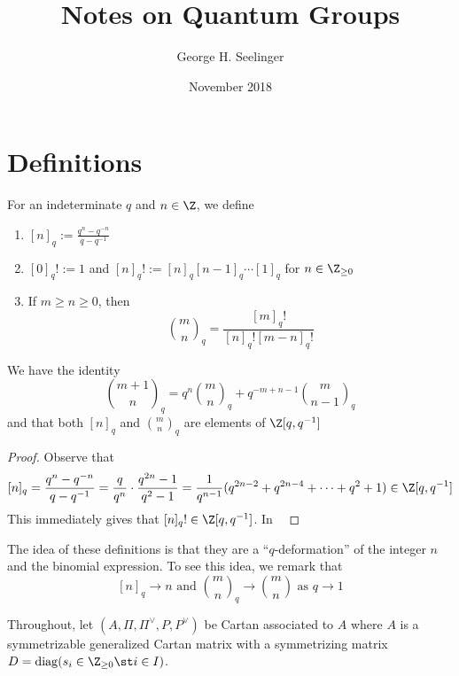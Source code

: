 \documentclass[11pt,leqno,oneside]{amsart}
\title[Notes on Quantum Groups]{Notes on Quantum Groups}
\author{George H. Seelinger}
\date{November 2018}
\numberwithin{thm}{section}
\newcommand{\weightlattice}{P}
\renewcommand{\simpleroots}{\Pi}
\newcommand{\qfactorial}[1]{[#1]_q!}
\newcommand{\qbinom}[3][q]{\binom{#2}{#3}_{#1}}
\DeclareMathOperator{\diag}{diag}
\begin{document}
\maketitle
\section{Definitions}
\begin{defn}
  For an indeterminate \(q\) and \(n \in \Z\), we define
  \begin{enumerate}
  \item \([n]_q := \frac{q^n-q^{-n}}{q-q^{-1}}\)
  \item \(\qfactorial{0} := 1\) and \(\qfactorial{n} := [n]_q [n-1]_q
    \cdots [1]_q\) for \(n \in \Z_{\geq 0}\)
  \item If \(m \geq n \geq 0\), then \[
      \qbinom{m}{n} = \frac{\qfactorial{m}}{\qfactorial{n}\qfactorial{m-n}}
    \]
  \end{enumerate}
\end{defn}
\begin{prop}
  We have the identity \[
    \qbinom{m+1}{n} = q^n \qbinom{m}{n} + q^{-m+n-1} \qbinom{m}{n-1}
  \]
  and that both \([n]_q\) and \(\qbinom{m}{n}\) are elements of
  \(\Z[q,q^{-1}]\) 
\end{prop}
\begin{proof}
  Observe that \[
    [n]_q = \frac{q^n-q^{-n}}{q-q^{-1}} = \frac{q}{q^n}\cdot
    \frac{q^{2n}-1}{q^2-1} =
    \frac{1}{q^{n-1}}(q^{2n-2}+q^{2n-4}+\cdots+q^2+1) \in \Z[q,q^{-1}]
  \]
  This immediately gives that \(\qfactorial{n} \in \Z[q,q^{-1}]\). In \
\end{proof}
The idea of these definitions is that they are a ``\(q\)-deformation''
of the integer \(n\) and the binomial expression. To see this idea,
we remark that \[
  [n]_q \to n \text{ and }\qbinom{m}{n} \to \binom{m}{n} \text{ as }q
  \to 1
\]
\begin{defn}
  Throughout, let \((A, \simpleroots, \simpleroots^\vee, \weightlattice,
  \weightlattice^\vee)\) be Cartan associated to \(A\) where \(A\) is
  a symmetrizable generalized Cartan matrix with a symmetrizing matrix
  \(D = \diag(s_i \in \Z_{\geq 0} \st i \in I)\).
\end{defn}
\end{document}
